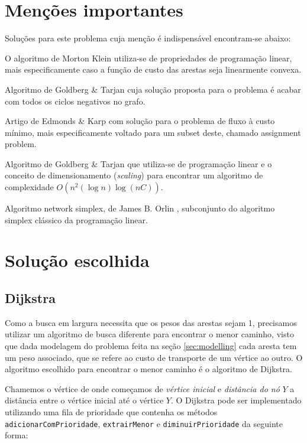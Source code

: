 \documentclass[12pt,a4]{article}
\begin{document}
\section{Menções importantes}
\label{sec:important-mentions}

Soluções para este problema cuja menção é indispensável encontram-se abaixo:

O algoritmo de Morton Klein \cite{ar:klein97} utiliza-se de propriedades
de programação linear, mais especificamente caso a função de custo das arestas
seja linearmente convexa.

Algoritmo de Goldberg \& Tarjan \cite{ar:goldberg-tarjan89} cuja solução
proposta para o problema é acabar com todos os ciclos negativos no grafo.

Artigo de Edmonds \& Karp \cite{ar:edmonds-karp72} com solução para o problema
de fluxo à custo mínimo, mais especificamente voltado para um subset deste,
chamado assignment problem.

Algoritmo de Goldberg \& Tarjan \cite{ar:goldberg-tarjan90} que utiliza-se de
programação linear e o conceito de dimensionamento (\emph{scaling}) para
encontrar um algoritmo de complexidade $O(n^2(\log n) \log(nC))$.

Algoritmo network simplex, de James B. Orlin \cite{in:orlin96}, subconjunto do
algoritmo simplex clássico da programação linear.

\section{Solução escolhida}
\label{sec:solution}

\subsection{Dijkstra}
\label{subsec:dijkstra}

Como a busca em largura necessita que os pesos das arestas sejam 1, precisamos
utilizar um algoritmo de busca diferente para encontrar o menor caminho, visto
que dada modelagem do problema feita na seção \ref{sec:modelling} cada aresta
tem um peso associado, que se refere ao custo de transporte de um vértice ao
outro. O algoritmo escolhido para encontrar o menor caminho é o algoritmo de
Dijkstra.

Chamemos o vértice de onde começamos de \emph{vértice inicial} e \emph{distância
  do nó} $Y$ a distância entre o vértice inicial até o vértice $Y$. O Dijkstra
pode ser implementado utilizando uma fila de prioridade que contenha os métodos
\texttt{adicionarComPrioridade}, \texttt{extrairMenor} e
\texttt{diminuirPrioridade} da seguinte forma:
\end{document}

